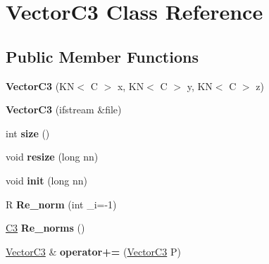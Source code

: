 \hypertarget{class_vector_c3}{}\section{Vector\+C3 Class Reference}
\label{class_vector_c3}
\subsection*{Public Member Functions}
\begin{DoxyCompactItemize}
\item 
{\bfseries Vector\+C3} (KN$<$ C $>$ x, KN$<$ C $>$ y, KN$<$ C $>$ z)\hypertarget{class_vector_c3_a3819abec03018706500308e2fe760b47}{}\label{class_vector_c3_a3819abec03018706500308e2fe760b47}

\item 
{\bfseries Vector\+C3} (ifstream \&file)\hypertarget{class_vector_c3_aca464d063912b45a97fbf335e5fedb3a}{}\label{class_vector_c3_aca464d063912b45a97fbf335e5fedb3a}

\item 
int {\bfseries size} ()\hypertarget{class_vector_c3_a9d4a6d129dfce4a03433d81b686a78fe}{}\label{class_vector_c3_a9d4a6d129dfce4a03433d81b686a78fe}

\item 
void {\bfseries resize} (long nn)\hypertarget{class_vector_c3_a9dbc6aa027809d23fc8ecfd7e39a243e}{}\label{class_vector_c3_a9dbc6aa027809d23fc8ecfd7e39a243e}

\item 
void {\bfseries init} (long nn)\hypertarget{class_vector_c3_a5e04afad147dfb37c08f908a2c63ff95}{}\label{class_vector_c3_a5e04afad147dfb37c08f908a2c63ff95}

\item 
R {\bfseries Re\+\_\+norm} (int \+\_\+i=-\/1)\hypertarget{class_vector_c3_a11a75ef12bb63b654eef63d9d74fed17}{}\label{class_vector_c3_a11a75ef12bb63b654eef63d9d74fed17}

\item 
\hyperlink{class_c3}{C3} {\bfseries Re\+\_\+norms} ()    \hypertarget{class_vector_c3_ac1d57bba18095492caab53a4c91737da}{}\label{class_vector_c3_ac1d57bba18095492caab53a4c91737da}

\item 
\hyperlink{class_vector_c3}{Vector\+C3} \& {\bfseries operator+=} (\hyperlink{class_vector_c3}{Vector\+C3} P)\hypertarget{class_vector_c3_a02fea8573dea54a12d98175f944ae25d}{}\label{class_vector_c3_a02fea8573dea54a12d98175f944ae25d}


\end{DoxyCompactItemize}

